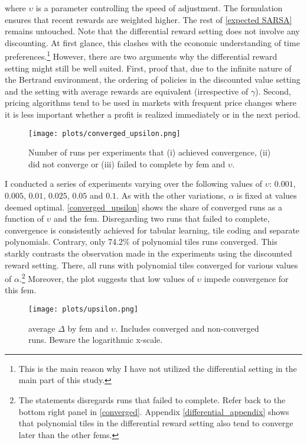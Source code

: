 where $\upsilon$ is a parameter controlling the speed of adjustment. The formulation ensures that recent rewards are weighted higher. The rest of \autoref{expected SARSA} remains untouched. Note that the differential reward setting does not involve any discounting. At first glance, this clashes with the economic understanding of time preferences.\footnote{This is the main reason why I have not utilized the differential setting in the main part of this study.} However, there are two arguments why the differential reward setting might still be well suited. First, \textcite[pp.253-254]{sutton_reinforcement_2018} proof that, due to the infinite nature of the Bertrand environment, the ordering of policies in the discounted value setting and the setting with average rewards are equivalent (irrespective of $\gamma$). Second, pricing algorithms tend to be used in markets with frequent price changes where it is less important whether a profit is realized immediately or in the next period.


\begin{figure}
	\texttt{[image: plots/converged\_upsilon.png]}
	\caption[Converged runs by \gls{fem} and $\upsilon$]{Number of runs per experiments that (i) achieved convergence, (ii) did not converge or (iii) failed to complete by \gls{fem} and $\upsilon$.}
	\label{converged_upsilon}
\end{figure}

I conducted a series of experiments varying over the following values of $\upsilon$: $0.001$, $0.005$, $0.01$, $0.025$, $0.05$ and $0.1$. As with the other variations, $\alpha$ is fixed at values deemed optimal. \autoref{converged_upsilon} shows the share of converged runs as a function of $\upsilon$ and the \gls{fem}. Disregarding two runs that failed to complete, convergence is consistently achieved for tabular learning, tile coding and separate polynomials. Contrary, only 74.2\% of polynomial tiles runs converged. This starkly contrasts the observation made in the experiments using the discounted reward setting. There, all runs with polynomial tiles converged for various values of $\alpha$.\footnote{The statements disregards runs that failed to complete. Refer back to the bottom right panel in \autoref{converged}. Appendix \ref{differential_appendix} shows that polynomial tiles in the differential reward setting also tend to converge later than the other \gls{fem}s.} Moreover, the plot suggests that low values of $\upsilon$ impede convergence for this \gls{fem}.


 \begin{figure}
	\texttt{[image: plots/upsilon.png]}
	\caption[average $\Delta$ by \gls{fem} and $\upsilon$]{average $\Delta$ by \gls{fem} and $\upsilon$. Includes converged and non-converged runs. Beware the logarithmic x-scale.}
	\label{upsilon}
\end{figure}


